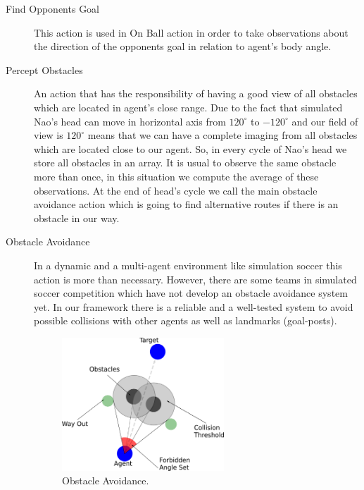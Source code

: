 \begin{description}
 
 \item[Find Opponents Goal] This action is used in On Ball action in order to take observations about the direction of the opponents goal in relation to agent's body angle.
 
 
 \item[Percept Obstacles]
 An action that has the responsibility of having a good view of all obstacles which are located in agent's close range. Due to the fact that simulated Nao's head can move in horizontal axis from $120^{\circ}$ to $-120^{\circ}$ and our field of view is $120^{\circ}$ means that we can have a complete imaging from all obstacles which are located close to our agent.
So, in every cycle of Nao's head we store all obstacles in an array. It is usual to observe the same obstacle more than once, in this situation we compute the average of these observations. At the end of head's cycle we call the main obstacle avoidance action which is going to find alternative routes if there is an obstacle in our way.


 \item[Obstacle Avoidance]
 In a dynamic and a multi-agent environment like simulation soccer this action is more than necessary. However, there are some teams in simulated soccer competition which have not develop an obstacle avoidance system yet. In our framework there is a
 reliable and a well-tested system to avoid possible collisions with other agents as well as landmarks (goal-posts).
 
 
  \begin{figure}[t!]
  \centering
  \includegraphics[width=0.6\textwidth]{Chapter3/figures/ObstacleAvoidance.pdf}
  \caption{Obstacle Avoidance.}
  \label{fig:ObstacleAvoidance}
\end{figure} 
\end{description}

